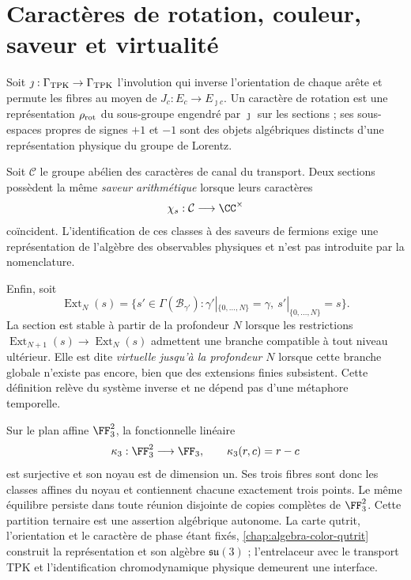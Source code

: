 \section{Caractères de rotation, couleur, saveur et virtualité}

Soit \(\jmath:\Gamma_{\rm TPK}\to\Gamma_{\rm TPK}\) l’involution qui inverse l’orientation de chaque arête et permute les fibres au moyen de \(J_c:E_c\to E_{\jmath c}\). Un caractère de rotation est une représentation \(\rho_{\rm rot}\) du sous-groupe engendré par \(\jmath\) sur les sections ; ses sous-espaces propres de signes \(+1\) et \(-1\) sont des objets algébriques distincts d’une représentation physique du groupe de Lorentz.

Soit \(\mathcal C\) le groupe abélien des caractères de canal du transport. Deux sections possèdent la même \emph{saveur arithmétique} lorsque leurs caractères
\[
 \chi_s:\mathcal C\longrightarrow\CC^\times
\]
coïncident. L’identification de ces classes à des saveurs de fermions exige une représentation de l’algèbre des observables physiques et n’est pas introduite par la nomenclature.

Enfin, soit
\[
 \operatorname{Ext}_N(s)=
 \{s'\in\Gamma(\mathcal B_{\gamma'}):
 \gamma'|_{\{0,\ldots,N\}}=\gamma,\ s'|_{\{0,\ldots,N\}}=s\}.
\]
La section est stable à partir de la profondeur \(N\) lorsque les restrictions \(\operatorname{Ext}_{N+1}(s)\to\operatorname{Ext}_N(s)\) admettent une branche compatible à tout niveau ultérieur. Elle est dite \emph{virtuelle jusqu’à la profondeur \(N\)} lorsque cette branche globale n’existe pas encore, bien que des extensions finies subsistent. Cette définition relève du système inverse et ne dépend pas d’une métaphore temporelle.

Sur le plan affine \(\FF_3^2\), la fonctionnelle linéaire
\[
 \kappa_3:\FF_3^2\longrightarrow\FF_3,
 \qquad \kappa_3(r,c)=r-c
\]
est surjective et son noyau est de dimension un. Ses trois fibres sont donc les classes affines du noyau et contiennent chacune exactement trois points. Le même équilibre persiste dans toute réunion disjointe de copies complètes de \(\FF_3^2\). Cette partition ternaire est une assertion algébrique autonome. La carte qutrit, l’orientation et le caractère de phase étant fixés, \cref{chap:algebra-color-qutrit} construit la représentation et son algèbre \(\mathfrak{su}(3)\) ; l’entrelaceur avec le transport TPK et l’identification chromodynamique physique demeurent une interface.
